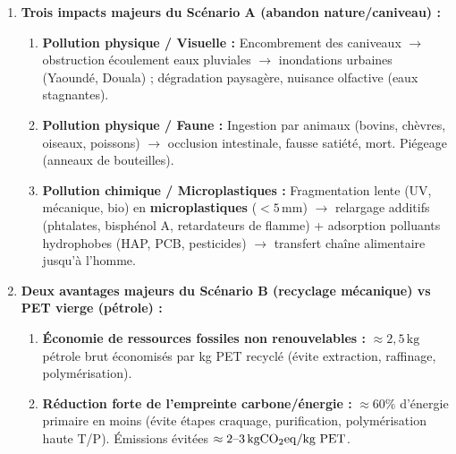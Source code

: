 \documentclass[11pt]{article}
\begin{document}
\begin{corrige}
\begin{enumerate}
    \item \textbf{Trois impacts majeurs du Scénario A (abandon nature/caniveau) :}
    \begin{enumerate}
        \item \textbf{Pollution physique / Visuelle :} Encombrement des caniveaux $\rightarrow$ obstruction écoulement eaux pluviales $\rightarrow$ inondations urbaines (Yaoundé, Douala) ; dégradation paysagère, nuisance olfactive (eaux stagnantes).
        \item \textbf{Pollution physique / Faune :} Ingestion par animaux (bovins, chèvres, oiseaux, poissons) $\rightarrow$ occlusion intestinale, fausse satiété, mort. Piégeage (anneaux de bouteilles).
        \item \textbf{Pollution chimique / Microplastiques :} Fragmentation lente (UV, mécanique, bio) en \textbf{microplastiques} ($<5\,\text{mm}$) $\rightarrow$ relargage additifs (phtalates, bisphénol A, retardateurs de flamme) + adsorption polluants hydrophobes (HAP, PCB, pesticides) $\rightarrow$ transfert chaîne alimentaire jusqu'à l'homme.
    \end{enumerate}

    \item \textbf{Deux avantages majeurs du Scénario B (recyclage mécanique) vs PET vierge (pétrole) :}
    \begin{enumerate}
        \item \textbf{Économie de ressources fossiles non renouvelables :} $\approx 2,5\,\text{kg}$ pétrole brut économisés par kg PET recyclé (évite extraction, raffinage, polymérisation).
        \item \textbf{Réduction forte de l'empreinte carbone/énergie :} $\approx 60\%$ d'énergie primaire en moins (évite étapes craquage, purification, polymérisation haute T/P). Émissions  évitées $\approx 2\text{--}3\,\text{kg}\ce{CO2eq}/\text{kg PET}$.
    \end{enumerate}


\end{enumerate}
\end{corrige}
\end{document}
